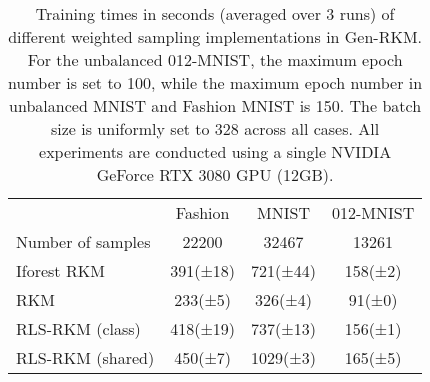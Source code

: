 \begin{table}[ht]
\centering
\begin{tabular}{lccc}
\toprule
{} &   Fashion &     MNIST & 012-MNIST \\
\cmidrule(lr){2-2} \cmidrule(lr){3-3} \cmidrule(lr){4-4}
Number of samples & 22200   & 32467 & 13261 \\
\midrule
Iforest RKM &  391(±18) &  721(±44) &  158(±2) \\
RKM              &   233(±5) &   326(±4) &   91(±0) \\
RLS-RKM (class)  &  418(±19) &  737(±13) &  156(±1) \\
RLS-RKM (shared) &   450(±7) &  1029(±3) &  165(±5) \\
\bottomrule
\end{tabular}
\caption{Training times in seconds (averaged over 3 runs) of different weighted sampling implementations in Gen-RKM. For the unbalanced 012-MNIST, the maximum epoch number is set to 100, while the maximum epoch number in unbalanced MNIST and Fashion MNIST is 150. The batch size is uniformly set to 328 across all cases. All experiments are conducted using a single NVIDIA GeForce RTX 3080 GPU (12GB).}
\label{tab-sampling-training-time}
\end{table}
